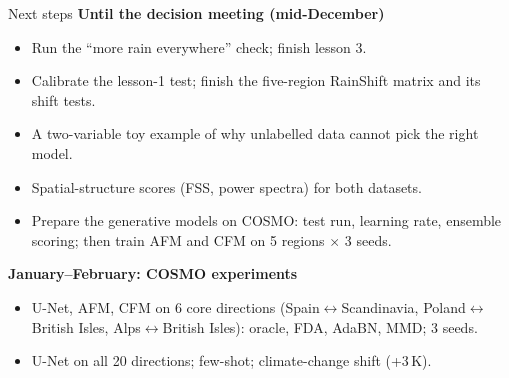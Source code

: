 \documentclass[11pt,aspectratio=169,xcolor=table]{beamer}
\begin{document}
\begin{frame}{Next steps}
\textbf{Until the decision meeting (mid-December)}
\begin{itemize}
  \item Run the ``more rain everywhere'' check; finish lesson 3.
  \item Calibrate the lesson-1 test; finish the five-region RainShift
        matrix and its shift tests.
  \item A two-variable toy example of why unlabelled data cannot pick the
        right model.
  \item Spatial-structure scores (FSS, power spectra) for both datasets.
  \item Prepare the generative models on COSMO: test run, learning rate,
        ensemble scoring; then train AFM and CFM on 5 regions $\times$ 3
        seeds.
\end{itemize}
\textbf{January--February: COSMO experiments}
\begin{itemize}
  \item U-Net, AFM, CFM on 6 core directions (Spain$\leftrightarrow$Scandinavia,
        Poland$\leftrightarrow$British Isles, Alps$\leftrightarrow$British Isles):
        oracle, FDA, AdaBN, MMD; 3 seeds.
  \item U-Net on all 20 directions; few-shot; climate-change shift (+3\,K).
\end{itemize}
\end{frame}
\end{document}
